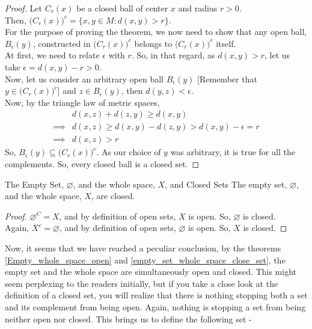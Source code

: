 \begin{proof}
    Let $C_{r}(x)$ be a closed ball of center $x$ and radius $r>0$.\\
    Then, $\big(C_{r}(x)\big)^c=\{x,y\in M:d(x,y)>r\}$.\\
    For the purpose of proving the theorem, we now need to show that any open ball, $B_{\epsilon}(y)$, constructed in $\big(C_r(x)\big)^c$ belongs to $\big(C_r(x)\big)^c$ itself.\\
    At first, we need to relate $\epsilon$ with $r$. So, in that regard, as $d(x,y)>r$, let us take $\boxed{\epsilon=d(x,y)-r>0}$.\\
    Now, let us consider an arbitrary open ball $B_{\epsilon}(y)$ [Remember that $y\in\big(C_r(x)\big)^c$] and $z\in B_{\epsilon}(y)$, then $d(y,z)<\epsilon$.\\
    Now, by the triangle law of metric spaces,
    \begin{align*}
        & d(x,z)+d(z,y) \geq d(x,y)\\
        \implies & d(x,z) \geq d(x,y)-d(z,y) > d(x,y)-\epsilon=r\\
        \implies & d(x,z) > r
    \end{align*}
    So, $B_{\epsilon}(y)\subseteq \big(C_r(x)\big)^c$. As our choice of $y$ was arbitrary, it is true for all the complements. So, every closed ball is a closed set.
\end{proof}
\begin{Theorem}{The Empty Set, $\varnothing$, and the whole space, $X$, and Closed Sets}\label{empty_set_whole_space_close_set}
    The empty set, $\varnothing$, and the whole space, $X$, are closed.
\end{Theorem}
\begin{proof}
    $\varnothing^C=X$, and by definition of open sets, $X$ is open. So, $\varnothing$ is closed.\\
    Again, $X^c=\varnothing$, and by definition of open sets, $\varnothing$ is open. So, $X$ is closed.
\end{proof}
\noindent Now, it seems that we have reached a peculiar conclusion, by the theorems \eqref{Empty_whole_space_open} and \eqref{empty_set_whole_space_close_set}, the empty set and the whole space are simultaneously open and closed. This might seem perplexing to the readers initially, but if you take a close look at the definition of a closed set, you will realize that there is nothing stopping both a set and its complement from being open. Again, nothing is stopping a set from being neither open nor closed. This brings us to define the following set -
